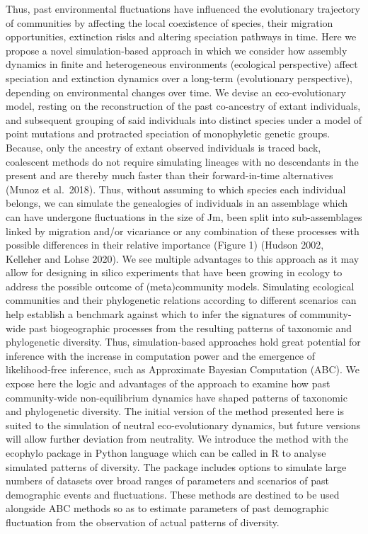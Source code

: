 \documentclass[
]{article}
\begin{document}
Thus, past environmental fluctuations have influenced the evolutionary
trajectory of communities by affecting the local coexistence of species,
their migration opportunities, extinction risks and altering speciation
pathways in time. Here we propose a novel simulation-based approach in
which we consider how assembly dynamics in finite and heterogeneous
environments (ecological perspective) affect speciation and extinction
dynamics over a long-term (evolutionary perspective), depending on
environmental changes over time. We devise an eco-evolutionary model,
resting on the reconstruction of the past co-ancestry of extant
individuals, and subsequent grouping of said individuals into distinct
species under a model of point mutations and protracted speciation of
monophyletic genetic groups. Because, only the ancestry of extant
observed individuals is traced back, coalescent methods do not require
simulating lineages with no descendants in the present and are thereby
much faster than their forward-in-time alternatives (Munoz et al.~2018).
Thus, without assuming to which species each individual belongs, we can
simulate the genealogies of individuals in an assemblage which can have
undergone fluctuations in the size of Jm, been split into
sub-assemblages linked by migration and/or vicariance or any combination
of these processes with possible differences in their relative
importance (Figure 1) (Hudson 2002, Kelleher and Lohse 2020). We see
multiple advantages to this approach as it may allow for designing in
silico experiments that have been growing in ecology to address the
possible outcome of (meta)community models. Simulating ecological
communities and their phylogenetic relations according to different
scenarios can help establish a benchmark against which to infer the
signatures of community-wide past biogeographic processes from the
resulting patterns of taxonomic and phylogenetic diversity. Thus,
simulation-based approaches hold great potential for inference with the
increase in computation power and the emergence of likelihood-free
inference, such as Approximate Bayesian Computation (ABC). We expose
here the logic and advantages of the approach to examine how past
community-wide non-equilibrium dynamics have shaped patterns of
taxonomic and phylogenetic diversity. The initial version of the method
presented here is suited to the simulation of neutral eco-evolutionary
dynamics, but future versions will allow further deviation from
neutrality. We introduce the method with the ecophylo package in Python
language which can be called in R to analyse simulated patterns of
diversity. The package includes options to simulate large numbers of
datasets over broad ranges of parameters and scenarios of past
demographic events and fluctuations. These methods are destined to be
used alongside ABC methods so as to estimate parameters of past
demographic fluctuation from the observation of actual patterns of
diversity.
\end{document}
